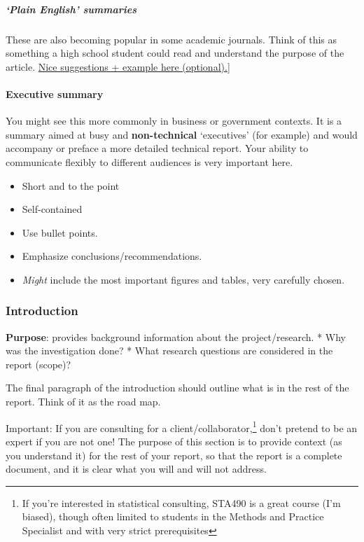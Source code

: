 \documentclass[
  openany]{book}
\providecommand{\tightlist}{%
  \setlength{\itemsep}{0pt}\setlength{\parskip}{0pt}}
\begin{document}
\hypertarget{plain-english-summaries}{%
\subparagraph{`Plain English' summaries}\label{plain-english-summaries}}

These are also becoming popular in some academic journals. Think of this as something a high school student could read and understand the purpose of the article. \href{https://www.agu.org/-/media/Files/Share-and-Advocate-for-Science/Toolkit---PLS.pdf}{Nice suggestions + example here (optional).}{]}

\hypertarget{executive-summary}{%
\paragraph{Executive summary}\label{executive-summary}}

You might see this more commonly in business or government contexts. It is a summary aimed at busy and \textbf{non-technical} `executives' (for example) and would accompany or preface a more detailed technical report. Your ability to communicate flexibly to different audiences is very important here.

\begin{itemize}
\tightlist
\item
  Short and to the point
\item
  Self-contained
\item
  Use bullet points.
\item
  Emphasize conclusions/recommendations.
\item
  \emph{Might} include the most important figures and tables, very carefully chosen.
\end{itemize}

\hypertarget{introreport}{%
\subsubsection{Introduction}\label{introreport}}

\textbf{Purpose}: provides background information about the project/research.
* Why was the investigation done?
* What research questions are considered in the report (scope)?

The final paragraph of the introduction should outline what is in the rest of the report. Think of it as the road map.

Important: If you are consulting for a client/collaborator,\footnote{If you're interested in statistical consulting, STA490 is a great course (I'm biased), though often limited to students in the Methods and Practice Specialist and with very strict prerequisites} don't pretend to be an expert if you are not one! The purpose of this section is to provide context (as you understand it) for the rest of your report, so that the report is a complete document, and it is clear what you will and will not address.
\end{document}
